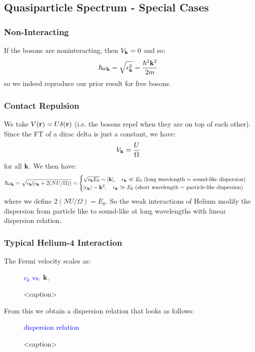 \subsection{Quasiparticle Spectrum - Special Cases}
\subsubsection{Non-Interacting}
If the bosons are noninteracting, then $V_{\mathbf{k}} = 0$ and so:
\begin{align*}
    \hbar\omega_{\mathbf{k}} = \sqrt{\epsilon_{\mathbf{k}}^2} = \frac{\hbar^2\mathbf{k}^2}{2m}
\end{align*}
so we indeed reproduce our prior result for free bosons.

\subsubsection{Contact Repulsion}
We take $V(\mathbf{r}) = U\delta(\mathbf{r})$ (i.e. the bosons repel when they are on top of each other). Since the FT of a dirac delta is just a constant, we have:
\begin{align*}
    V_{\mathbf{k}} = \frac{U}{\Omega}
\end{align*}
for all $\mathbf{k}$. We then have:
\begin{equation}
    \hbar\omega_{\mathbf{k}} = \sqrt{\epsilon_{\mathbf{k}}(\epsilon_{\mathbf{k}} + 2(NU/\Omega))} = \begin{cases}
        \sqrt{\epsilon_{\mathbf{k}}E_0} \sim \lvert \mathbf{k} \rvert, \quad \epsilon_{\mathbf{k}} \ll E_0 \text{ (long wavelength = sound-like dispersion)}
        \\ \lvert \epsilon_{\mathbf{k}} \rvert \sim \mathbf{k}^2, \quad \epsilon_{\mathbf{k}} \gg E_0 \text{ (short wavelength = particle-like dispersion)}
    \end{cases}
\end{equation}
where we define $2(NU/\Omega) = E_0$. So the weak interactions of Helium modify the dispersion from particle like to sound-like at long wavelengths with linear dispersion relation.

\subsubsection{Typical Helium-4 Interaction}
The Fermi velocity scales as:
\begin{figure}[htbp]
    \centering
    \textcolor{blue}{$v_k$ vs. $\mathbf{k}$.}
    \caption{<caption>}
    \label{<label>}
\end{figure}
From this we obtain a dispersion relation that looks as follows:
\begin{figure}[htbp]
    \centering
    \textcolor{blue}{dispersion relation}
    \caption{<caption>}
    \label{<label>}
\end{figure}

